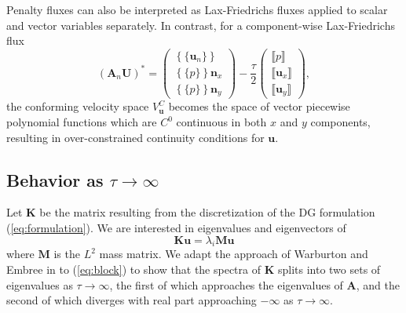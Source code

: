 \documentclass[preprint,10pt]{elsarticle}
\newcommand{\LRc}[1]{\left\{ #1 \right\}}
\newcommand{\jump}[1] {\ensuremath{\llbracket#1\rrbracket}}
\newcommand{\avg}[1] {\ensuremath{\LRc{\!\{#1\}\!}}}
\begin{document}
Penalty fluxes can also be interpreted as Lax-Friedrichs fluxes applied to scalar and vector variables separately.  In contrast, for a component-wise Lax-Friedrichs flux 
\[
(\bm{A}_n\bm{U})^* = \left(\begin{array}{c}
\avg{\bm{u}_n}\\
\avg{p }\bm{n}_x\\
\avg{p }\bm{n}_y
\end{array}
\right) - 
\frac{\tau}{2}\left(\begin{array}{c}
\jump{p}\\
\jump{\bm{u}_x}\\
\jump{\bm{u}_y}
\end{array}
\right),
\]
the conforming velocity space $V^C_{\bm{u}}$ becomes the space of vector piecewise polynomial functions which are $C^0$ continuous in both $x$ and $y$ components, resulting in over-constrained continuity conditions for $\bm{u}$.

\subsection{Behavior as $\tau\rightarrow\infty$}

Let $\bm{K}$ be the matrix resulting from the discretization of the DG formulation (\ref{eq:formulation}).  We are interested in eigenvalues and eigenvectors of 
\[
\bm{K}\bm{u} = \lambda_i\bm{M}\bm{u}
\]
where $\bm{M}$ is the $L^2$ mass matrix.  We adapt the approach of Warburton and Embree in \cite{Warburton20063205} to (\ref{eq:block}) to show that the spectra of $\bm{K}$ splits into two sets of eigenvalues as $\tau\rightarrow \infty$, the first of which approaches the eigenvalues of $\bm{A}$, and the second of which diverges with real part approaching $-\infty$ as $\tau\rightarrow \infty$.  
\end{document}
